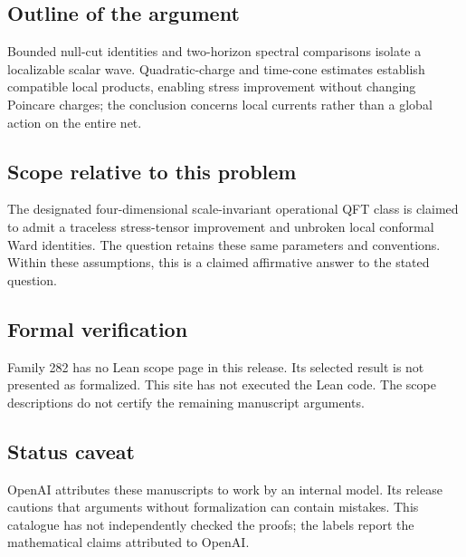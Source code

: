 \documentclass[11pt]{article}
\begin{document}
\subsection{Outline of the argument}
Bounded null-cut identities and two-horizon spectral comparisons isolate a localizable scalar wave. Quadratic-charge and time-cone estimates establish compatible local products, enabling stress improvement without changing Poincare charges; the conclusion concerns local currents rather than a global action on the entire net.

\subsection{Scope relative to this problem}
The designated four-dimensional scale-invariant operational QFT class is claimed to admit a traceless stress-tensor improvement and unbroken local conformal Ward identities. The question retains these same parameters and conventions. Within these assumptions, this is a claimed affirmative answer to the stated question.

\subsection{Formal verification}
Family 282 has no Lean scope page in this release. Its selected result is not presented as formalized. This site has not executed the Lean code. The scope descriptions do not certify the remaining manuscript arguments.

\subsection{Status caveat}
OpenAI attributes these manuscripts to work by an internal model. Its release cautions that arguments without formalization can contain mistakes. This catalogue has not independently checked the proofs; the labels report the mathematical claims attributed to OpenAI.
\end{document}

